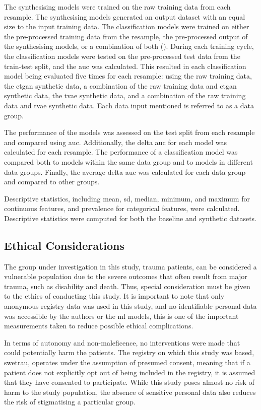 \documentclass[12pt, a4paper]{article}
\begin{document}
The synthesising models were trained on the raw training data from each resample. The synthesising models generated an output dataset with an equal size to the input training data. The classification models were trained on either the pre-processed training data from the resample, the pre-processed output of the synthesising models, or a combination of both (). During each training cycle, the classification models were tested on the pre-processed test data from the train-test split, and the \acrshort{auc} was calculated. This resulted in each classification model being evaluated five times for each resample: using the raw training data, the \acrshort{ctgan} synthetic data, a combination of the raw training data and \acrshort{ctgan} synthetic data, the \acrshort{tvae} synthetic data, and a combination of the raw training data and \acrshort{tvae} synthetic data. Each data input mentioned is referred to as a data group.

The performance of the models was assessed on the test split from each resample and compared using \acrshort{auc}. Additionally, the delta \acrshort{auc} for each model was calculated for each resample. The performance of a classification model was compared both to models within the same data group and to models in different data groups. Finally, the average delta \acrshort{auc} was calculated for each data group and compared to other groups.

Descriptive statistics, including mean, \acrfull{sd}, median, minimum, and maximum for continuous features, and prevalence for categorical features, were calculated. Descriptive statistics were computed for both the baseline and synthetic datasets.

\subsection{Ethical Considerations}
The group under investigation in this study, trauma patients, can be considered a vulnerable population due to the severe outcomes that often result from major trauma, such as disability and death. Thus, special consideration must be given to the ethics of conducting this study. It is important to note that only anonymous registry data was used in this study, and no identifiable personal data was accessible by the authors or the \acrshort{ml} models, this is one of the important measurements taken to reduce possible ethical complications.

In terms of autonomy and non-maleficence, no interventions were made that could potentially harm the patients. The registry on which this study was based, \acrshort{swetrau}, operates under the assumption of presumed consent, meaning that if a patient does not explicitly opt out of being included in the registry, it is assumed that they have consented to participate. While this study poses almost no risk of harm to the study population, the absence of sensitive personal data also reduces the risk of stigmatising a particular group.
\end{document}
